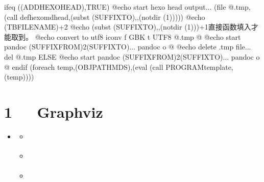 \documentclass[letterpaper,12pt,english]{sphinxmanual}
\begin{document}
\begin{sphinxVerbatim}[commandchars=\\\{\}]
ifeq (\PYGZdl{}(ADD\PYGZus{}HEXO\PYGZus{}HEAD),TRUE)
  @echo start hexo head output...
  \PYGZdl{}\PYGZdl{}(file \PYGZgt{}\PYGZdl{}\PYGZdl{}@.tmp,\PYGZdl{}\PYGZdl{}(call def\PYGZus{}hexo\PYGZus{}md\PYGZus{}head,\PYGZdl{}(subst \PYGZdl{}(SUFFIX\PYGZus{}TO),,\PYGZdl{}(notdir \PYGZdl{}(1)))))
\PYGZsh{} @echo \PYGZdl{}\PYGZdl{}(TBFILENAME)+2
\PYGZsh{} @echo \PYGZdl{}(subst \PYGZdl{}(SUFFIX\PYGZus{}TO),,\PYGZdl{}(notdir \PYGZdl{}(1)))+1\PYGZsh{}直接函数填入才能取到。
  @echo convert to utf8
  iconv \PYGZhy{}f GBK \PYGZhy{}t UTF\PYGZhy{}8 \PYGZdl{}\PYGZdl{}@.tmp \PYGZgt{}\PYGZdl{}\PYGZdl{}@
  @echo start pandoc \PYGZdl{}(SUFFIX\PYGZus{}FROM)2\PYGZdl{}(SUFFIX\PYGZus{}TO)...
  pandoc \PYGZdl{}\PYGZdl{}\PYGZlt{} \PYGZhy{}o \PYGZhy{} \PYGZgt{}\PYGZgt{}\PYGZdl{}\PYGZdl{}@
  @echo delete .tmp file...
  del \PYGZdl{}\PYGZdl{}@.tmp
ELSE
  @echo start pandoc \PYGZdl{}(SUFFIX\PYGZus{}FROM)2\PYGZdl{}(SUFFIX\PYGZus{}TO)...
  pandoc \PYGZdl{}\PYGZdl{}\PYGZlt{} \PYGZhy{}o \PYGZdl{}\PYGZdl{}@
endif
\PYGZdl{}(foreach temp,\PYGZdl{}(OBJ\PYGZus{}PATH\PYGZus{}MDS),\PYGZdl{}(eval \PYGZdl{}(call PROGRAM\PYGZus{}template,\PYGZdl{}(temp))))
\end{sphinxVerbatim}


\chapter{1   Graphviz}
\label{\detokenize{001software/001install/Graphviz:graphviz}}\label{\detokenize{001software/001install/Graphviz::doc}}
\begin{sphinxShadowBox}
\begin{itemize}
\item {} 
\label{\detokenize{001software/001install/Graphviz:id2}}{\hyperref[\detokenize{001software/001install/Graphviz:graphviz}]{}}
\begin{itemize}
\item {} 
\label{\detokenize{001software/001install/Graphviz:id3}}{\hyperref[\detokenize{001software/001install/Graphviz:install}]{}}

\item {} 
\label{\detokenize{001software/001install/Graphviz:id4}}{\hyperref[\detokenize{001software/001install/Graphviz:tips}]{}}

\item {} 
\label{\detokenize{001software/001install/Graphviz:id5}}{\hyperref[\detokenize{001software/001install/Graphviz:faq}]{}}

\end{itemize}

\end{itemize}
\end{sphinxShadowBox}
\end{document}
